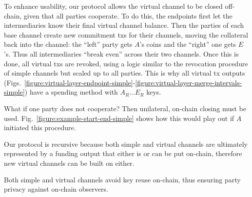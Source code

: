   To enhance usability, our protocol allows the virtual channel to be closed
  off-chain, given that all parties cooperate. To do this, the endpoints first
  let the intermediaries know their final virtual channel balance. Then the
  parties of each base channel create new commitment txs for their channels,
  moving the collateral back into the channel: the ``left'' party gets $A$'s
  coins and the ``right'' one gets $E$'s. Thus all intermediaries ``break even''
  across their two channels. Once this is done, all virtual txs are revoked,
  using a logic similar to the revocation procedure of simple channels but
  scaled up to all parties. This is why all virtual tx outputs
  (Figs.~\ref{figure:virtual-layer-endpoint-simple}-\ref{figure:virtual-layer-merge-intervals-simple})
  have a spending method with $A_R \dots E_R$ keys.

  What if one party does not cooperate? Then unilateral, on-chain
  closing must be used. Fig.~\ref{figure:example-start-end-simple} shows how
  this would play out if $A$ initiated this procedure.

  Our protocol is recursive because both simple and virtual channels are
  ultimately represented by a funding output that either is or can be put
  on-chain, therefore new virtual channels can be built on either.

  Both simple and virtual channels avoid key reuse on-chain, thus ensuring party
  privacy against on-chain observers.
